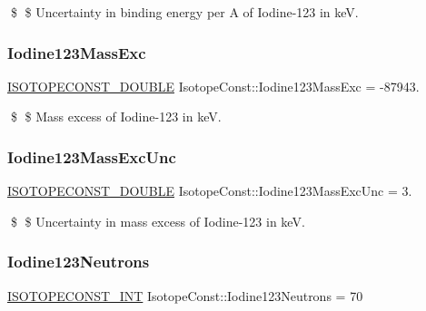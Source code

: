 \$ \$ Uncertainty in binding energy per A of Iodine-\/123 in keV. \mbox{\label{group___isotope_const-_iodine-_i123_gaed681542faf54cb59eddd01bff04bb69}} 
\subsubsection{\texorpdfstring{Iodine123\+Mass\+Exc}{Iodine123MassExc}}
{\footnotesize\ttfamily \mbox{\hyperlink{group___isotope_const-_macros_ga8f45a7272ce02c0b4c65c44636ed719a}{I\+S\+O\+T\+O\+P\+E\+C\+O\+N\+S\+T\+\_\+\+D\+O\+U\+B\+LE}} Isotope\+Const\+::\+Iodine123\+Mass\+Exc = -\/87943.}

\$ \$ Mass excess of Iodine-\/123 in keV. \mbox{\label{group___isotope_const-_iodine-_i123_gad859fe5665679d5cca1a40f3a4202cb1}} 
\subsubsection{\texorpdfstring{Iodine123\+Mass\+Exc\+Unc}{Iodine123MassExcUnc}}
{\footnotesize\ttfamily \mbox{\hyperlink{group___isotope_const-_macros_ga8f45a7272ce02c0b4c65c44636ed719a}{I\+S\+O\+T\+O\+P\+E\+C\+O\+N\+S\+T\+\_\+\+D\+O\+U\+B\+LE}} Isotope\+Const\+::\+Iodine123\+Mass\+Exc\+Unc = 3.}

\$ \$ Uncertainty in mass excess of Iodine-\/123 in keV. \mbox{\label{group___isotope_const-_iodine-_i123_ga46ecaea3f74519bb03cd809b7b3eee8c}} 
\subsubsection{\texorpdfstring{Iodine123\+Neutrons}{Iodine123Neutrons}}
{\footnotesize\ttfamily \mbox{\hyperlink{group___isotope_const-_macros_ga5f18360b3e99483a35c32d789e62621c}{I\+S\+O\+T\+O\+P\+E\+C\+O\+N\+S\+T\+\_\+\+I\+NT}} Isotope\+Const\+::\+Iodine123\+Neutrons = 70}

